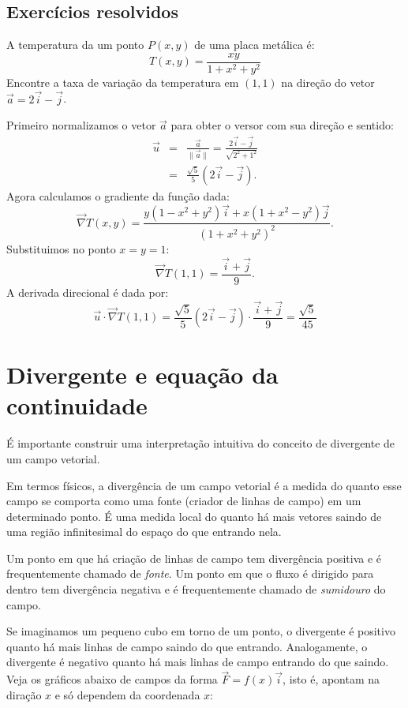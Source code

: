 \subsection*{Exercícios resolvidos}
\begin{exeresol}
A temperatura da um ponto $P(x, y)$ de uma placa metálica é:
$$T(x, y) = \frac{xy}{1+x^2+y^2}$$
Encontre a taxa de variação da temperatura em $(1, 1)$ na direção do vetor $\vec{a}=2\vec{i}-\vec{j}$.
\end{exeresol}
\begin{resol}
Primeiro normalizamos o vetor $\vec{a}$ para obter o versor com sua direção e sentido:
\begin{eqnarray*}
\vec{u}&=&\frac{\vec{a}}{\|\vec{a}\|}=\frac{2\vec{i}-\vec{j}}{\sqrt{2^2+1^2}}\\
&=&\frac{\sqrt{5}}{5}\left(2\vec{i}-\vec{j}\right).
\end{eqnarray*}
Agora calculamos o gradiente da função dada:
$$\vec{\nabla}T(x, y) = \frac{y(1-x^2+y^2)\vec{i} + x(1+x^2-y^2)\vec{j}}{\left(1+x^2+y^2\right)^2}.$$
Substituimos no ponto $x=y=1$:
$$\vec{\nabla}T(1, 1) = \frac{\vec{i} + \vec{j}}{9}.$$
A derivada direcional é dada por:
$$\vec{u}\cdot\vec{\nabla}T(1,1) = \frac{\sqrt{5}}{5}\left(2\vec{i}-\vec{j}\right)\cdot \frac{\vec{i} + \vec{j}}{9}=\frac{\sqrt{5}}{45}$$
\end{resol}

\section{Divergente e equação da continuidade}
É importante construir uma interpretação intuitiva do conceito de divergente de um campo vetorial.

Em termos físicos, a divergência de um campo vetorial é a medida do quanto esse campo se comporta como uma fonte (criador de linhas de campo) em um determinado ponto. É uma medida local do quanto há mais vetores saindo de uma região infinitesimal do espaço do que entrando nela. 

Um ponto em que há criação de linhas de campo tem divergência positiva e é frequentemente chamado de \emph{fonte}. Um ponto em que o fluxo é dirigido para dentro tem divergência negativa e é frequentemente chamado de \emph{sumidouro} do campo. 

Se imaginamos um pequeno cubo em torno de um ponto, o divergente é positivo quanto há mais linhas de campo saindo do que entrando. Analogamente, o divergente é negativo quanto há mais linhas de campo entrando do que saindo. Veja os gráficos abaixo de campos da forma $\vec{F}=f(x)\vec{i}$, isto é, apontam na diração $x$ e só dependem da coordenada $x$:

